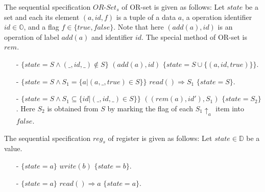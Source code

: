 \begin{example}[OR-Set]
\label{definition:sequential specification of or-set}
The sequential specification $\mathit{OR}$-$\mathit{Set}_s$ of OR-set is given as follows: Let $\mathit{state}$ be a set and each its element $(a,\mathit{id},f)$ is a tuple of a data $a$, a operation identifier $\mathit{id} \in \mathbb{O}$, and a flag $f \in \{ \mathit{true},\mathit{false} \}$. Note that here $(add(a),\mathit{id})$ is an operation of label $add(a)$ and identifier $\mathit{id}$. The special method of OR-set is $\mathit{rem}$.
\begin{itemize}
\setlength{\itemsep}{0.5pt}
\item[-] $\{ \mathit{state} = S  \wedge (\_,\mathit{id},\_) \notin S \}$ $(\mathit{add}(a),\mathit{id})$ $\{ \mathit{state} = S \cup \{ (a,\mathit{id},\mathit{true}) \} \}$.
\item[-] $\{ \mathit{state} = S \wedge S_1 = \{ a \vert (a,\_,\mathit{true}) \in S \} \}$ $\mathit{read}() \Rightarrow S_1$ $\{ \mathit{state} = S \}$.
\item[-] $\{ \mathit{state} = S  \wedge S_1 \subseteq \{\mathit{id} \vert (\_,\mathit{id},\_) \in S\} \}$ $((rem(a),\mathit{id}'),S_1)$ $\{ \mathit{state} = S_2  \}$. Here $S_2$ is obtained from $S$ by marking the flag of each $S_1 \uparrow_{a}$ item into $\mathit{false}$.
\end{itemize}
\end{example}


\begin{example}[Register]
\label{definition:sequential specification of register}
The sequential specification $\mathit{reg}_s$ of register is given as follows: Let $\mathit{state} \in \mathbb{D}$ be a value.
\begin{itemize}
\setlength{\itemsep}{0.5pt}
\item[-] $\{ \mathit{state} = a  \}$ $\mathit{write}(b)$ $\{ \mathit{state} = b \}$.
\item[-] $\{ \mathit{state} = a \}$ $\mathit{read}() \Rightarrow a$ $\{ \mathit{state} = a \}$.
\end{itemize}
\end{example}


